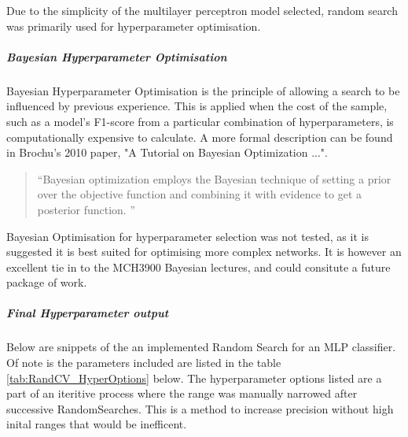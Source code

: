 \documentclass{UoNMCHA}
\newcommand{\inlineQuote}[1]{``#1''}
\newcommand{\fancyquote}[1]{\begin{quotation}\inlineQuote{#1}\end{quotation}}
\numberwithin{equation}{section}
\begin{document}
Due to the simplicity of the multilayer perceptron model selected, random search was primarily used for hyperparameter optimisation.

\subparagraph{Bayesian Hyperparameter Optimisation}
Bayesian Hyperparameter Optimisation is the principle of allowing a search to be influenced by previous experience. This is applied when the cost of the sample, such as a model's F1-score from a particular combination of hyperparameters, is computationally expensive to calculate. A more formal description can be found in Brochu's 2010 paper, "A Tutorial on Bayesian Optimization ...".

\fancyquote{Bayesian optimization employs the Bayesian technique of setting a prior over the objective function and combining it with evidence to get a posterior function. \cite{Brochu2010}}

Bayesian Optimisation for hyperparameter selection was not tested, as it is suggested it is best suited for optimising more complex networks. \cite{Snoek2012} \cite{Brochu2010} It is however an excellent tie in to the MCH3900 Bayesian lectures, and could consitute a future package of work.

\subparagraph{Final Hyperparameter output}
Below are snippets of the an implemented Random Search for an MLP classifier. Of note is the parameters included are listed in the table \ref{tab:RandCV_HyperOptions} below. The hyperparameter options listed are a part of an iteritive process where the range was manually narrowed after successive RandomSearches. This is a method to increase precision without high inital ranges that would be inefficent. 
\end{document}
